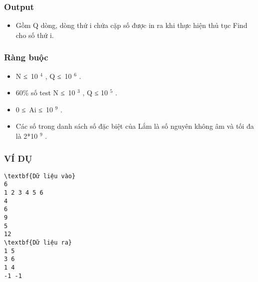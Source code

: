 \subsubsection{\textbf{Output}}
\begin{itemize}
	\item Gồm Q dòng, dòng thứ i chứa cặp số được in ra khi thực hiện thủ tục Find cho số thứ i.
\end{itemize}

\subsubsection{\textbf{Ràng buộc}}
\begin{itemize}
	\item N ≤ 10 $^ 4 $ , Q ≤ 10 $^ 6 $ .
	\item 60\% số test N ≤ 10 $^ 3 $ , Q ≤ 10 $^ 5 $ .
	\item 0 ≤ Ai ≤ 10 $^ 9 $ .
	\item Các số trong danh sách số đặc biệt của Lắm là số nguyên không âm và tối đa là 2*10 $^ 9 $ .
\end{itemize}

\subsubsection{\textbf{VÍ DỤ }}
\begin{verbatim}
\textbf{Dữ liệu vào}
6
1 2 3 4 5 6
4
6
9
5
12
\textbf{Dữ liệu ra}
1 5
3 6
1 4
-1 -1
\end{verbatim}
